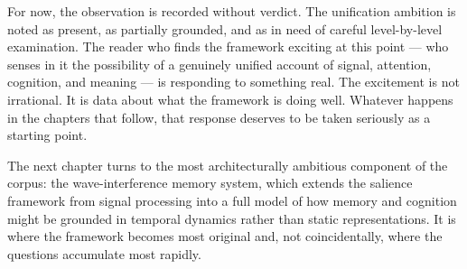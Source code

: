 For now, the observation is recorded without verdict. The unification
ambition is noted as present, as partially grounded, and as in need
of careful level-by-level examination. The reader who finds the
framework exciting at this point --- who senses in it the possibility
of a genuinely unified account of signal, attention, cognition, and
meaning --- is responding to something real. The excitement is not
irrational. It is data about what the framework is doing well.
Whatever happens in the chapters that follow, that response deserves
to be taken seriously as a starting point.

\medskip

The next chapter turns to the most architecturally ambitious
component of the corpus: the \MEMeight{} wave-interference memory
system, which extends the salience framework from signal processing
into a full model of how memory and cognition might be grounded in
temporal dynamics rather than static representations. It is where
the framework becomes most original and, not coincidentally, where
the questions accumulate most rapidly.
